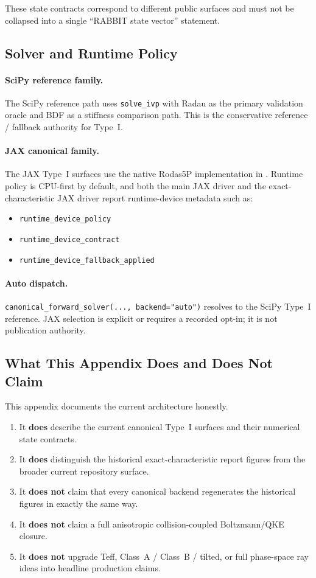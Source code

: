These state contracts correspond to different public surfaces and must not be collapsed into a single ``RABBIT state vector'' statement.

\subsection{Solver and Runtime Policy}

\paragraph{SciPy reference family.}
The SciPy reference path uses \texttt{solve\_ivp} with Radau as the primary validation oracle and BDF as a stiffness comparison path.  This is the conservative reference / fallback authority for Type~I.

\paragraph{JAX canonical family.}
The JAX Type~I surfaces use the native Rodas5P implementation in .  Runtime policy is CPU-first by default, and both the main JAX driver and the exact-characteristic JAX driver report runtime-device metadata such as:
\begin{itemize}
\item \texttt{runtime\_device\_policy}
\item \texttt{runtime\_device\_contract}
\item \texttt{runtime\_device\_fallback\_applied}
\end{itemize}

\paragraph{Auto dispatch.}
\texttt{canonical\_forward\_solver(..., backend="auto")} resolves to the SciPy Type~I reference.  JAX selection is explicit or requires a recorded opt-in; it is not publication authority.

\subsection{What This Appendix Does and Does Not Claim}

This appendix documents the current architecture honestly.
\begin{enumerate}
\item It \textbf{does} describe the current canonical Type~I surfaces and their numerical state contracts.
\item It \textbf{does} distinguish the historical exact-characteristic report figures from the broader current repository surface.
\item It \textbf{does not} claim that every canonical backend regenerates the historical figures in exactly the same way.
\item It \textbf{does not} claim a full anisotropic collision-coupled Boltzmann/QKE closure.
\item It \textbf{does not} upgrade Teff, Class~A / Class~B / tilted, or full phase-space ray ideas into headline production claims.
\end{enumerate}

